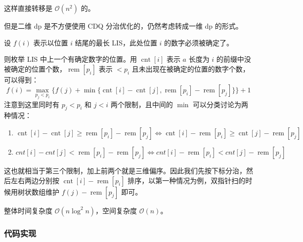 这样直接转移是 \(\mathcal{O}(n^2)\) 的。

但是二维 dp 是不方便使用 CDQ 分治优化的，仍然考虑转成一维 dp 的形式。

设 \(f(i)\) 表示以位置 \(i\) 结尾的最长 LIS，此处位置 \(i\)
的数字必须被确定了。

则枚举 LIS 中上一个有确定数字的位置。用 \(\operatorname{cnt}[i]\) 表示
\(a\) 长度为 \(i\)
的前缀中没被确定的位置个数，\(\operatorname{rem}[p_i]\) 表示 \(< p_i\)
且未出现在被确定的位置的数字个数，可以得到： \[
f(i)=\max_{p_j\lt p_i}\{f(j)+\min\{\operatorname{cnt}[i]-\operatorname{cnt}[j],\operatorname{rem}[p_i]-\operatorname{rem}[p_j]\}\}+1
\] 注意到这里同时有 \(p_j<p_i\) 和 \(j<i\) 两个限制，且中间的 \(\min\)
可以分类讨论为两种情况：

\begin{enumerate}
\def\labelenumi{\arabic{enumi}.}
\tightlist
\item
  \(\operatorname{cnt}[i]-\operatorname{cnt}[j]\geq\operatorname{rem}[p_i]-\operatorname{rem}[p_j] \iff \operatorname{cnt}[i]-\operatorname{rem}[p_i]\geq\operatorname{cnt}[j]-\operatorname{rem}[p_j]\)
\item
  \(cnt[i]-cnt[j]<\operatorname{rem}[p_i]-\operatorname{rem}[p_j] \iff cnt[i]-\operatorname{rem}[p_i]<cnt[j]-\operatorname{rem}[p_j]\)
\end{enumerate}

这也就相当于第三个限制，加上前两个就是三维偏序。因此我们先按下标分治，然后左右两边分别按
\(\operatorname{cnt}[i]-\operatorname{rem}[p_i]\)
排序，以第一种情况为例，双指针扫的时候用树状数组维护
\(f(j)-\operatorname{rem}[p_j]\) 即可。

整体时间复杂度 \(\mathcal{O}(n \log^2 n)\)，空间复杂度
\(\mathcal{O}(n)\)。

\subsubsection{代码实现}

